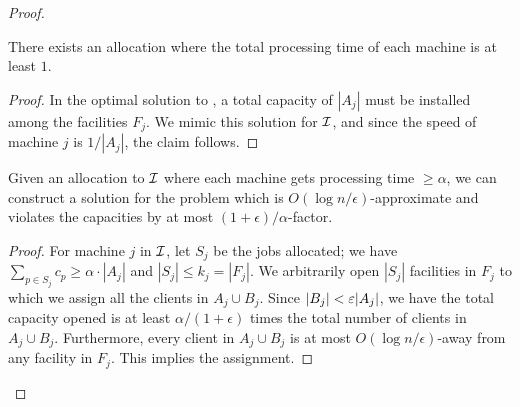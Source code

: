 \begin{proof}
	\begin{claim}
		There exists an allocation where the total processing time of each machine is at least $1$.
	\end{claim}
	\begin{proof}
		In the optimal solution to \mckc, a total capacity of $|A_j|$ must be installed among the facilities $F_j$. 
		We mimic this solution for ${\cal I}$, and since the speed of machine $j$ is $1/|A_j|$, the claim follows.
	\end{proof}
	\begin{claim}
		Given an allocation to ${\cal I}$ where each machine gets processing time $\geq \alpha$, we can construct a solution for the \mckc problem
		which is $O(\log n/\epsilon)$-approximate and violates the capacities by at most $(1+\epsilon)/\alpha$-factor.
	\end{claim}
	\begin{proof}
		For machine $j$ in ${\cal I}$, let $S_j$ be the jobs allocated; we have $\sum_{p\in S_j} c_p \ge \alpha\cdot |A_j|$ and $|S_j| \leq k_j = |F_j|$.
		We arbitrarily open $|S_j|$ facilities in $F_j$ to which we assign all the clients in $A_j \cup B_j$. Since $|B_j|<\varepsilon |A_j|$, we have the total capacity opened is at least $\alpha/(1+\epsilon)$ times 
		the total number of clients in $A_j\cup B_j$. Furthermore, every client in $A_j\cup B_j$ is at most $O(\log n/\epsilon)$-away from any facility in $F_j$. This implies the assignment.
	\end{proof}	
\end{proof}

